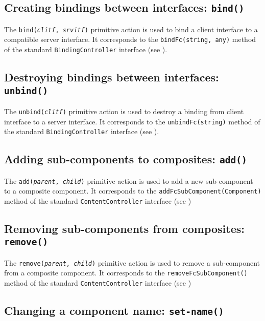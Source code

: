 \documentclass[a4paper,12pt]{report}
\begin{document}
\subsection{Creating bindings between interfaces: \texttt{bind()}}
\label{sec:action:bind}

The \texttt{bind(\textsl{clitf}, \textsl{srvitf})} primitive action is used to bind a
client interface to a compatible server interface. It corresponds to the
\texttt{bindFc(string, any)} method of the standard \texttt{BindingController} interface
(see \citep[Sec.~4.3, p.~14]{bruneton-coupaye-stefani.ow2003}).

\subsection{Destroying bindings between interfaces: \texttt{unbind()}}
\label{sec:action:unbind}

The \texttt{unbind(\textsl{clitf})} primitive action is used to destroy a binding from
client interface to a server interface. It corresponds to the \texttt{unbindFc(string)}
method of the standard \texttt{BindingController} interface (see \citep[Sec.~4.3,
p.~14]{bruneton-coupaye-stefani.ow2003}).

\subsection{Adding sub-components to composites: \texttt{add()}}
\label{sec:action:add}

The \texttt{add(\textsl{parent}, \textsl{child})} primitive action is used to add a new
sub-component to a composite component. It corresponds to the
\texttt{addFcSubComponent(Component)} method of the standard \texttt{ContentController}
interface (see \citep[Sec.~4.4, p.~15]{bruneton-coupaye-stefani.ow2003})

\subsection{Removing sub-components from composites: \texttt{remove()}}
\label{sec:action:remove}

The \texttt{remove(\textsl{parent}, \textsl{child})} primitive action is used to remove a
sub-component from a composite component. It corresponds to the
\texttt{remove\-Fc\-Sub\-Component()} method of the standard \texttt{Content\-Controller}
interface (see \citep[Sec.~4.4, p.~16]{bruneton-coupaye-stefani.ow2003})

\subsection{Changing a component name: \texttt{set-name()}}
\label{sec:action:set-name}
\end{document}
